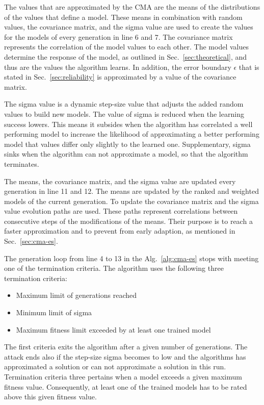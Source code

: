 The values that are approximated by the \ac{CMA} are the means of the distributions of the values that define a model.
These means in combination with random values, the covariance matrix, and the sigma value are used to create the values for the models of every generation in line 6 and 7. %
The covariance matrix represents the correlation of the model values to each other.
The model values determine the response of the \apuf model, as outlined in Sec.\ \ref{sec:theoretical}, and thus are the values the algorithm learns.
In addition, the error boundary $\epsilon$ that is stated in Sec.\ \ref{sec:reliability} is approximated by a value of the covariance matrix.

The sigma value is a dynamic step-size value that adjusts the added random values to build new models.
The value of sigma is reduced when the learning success lowers.
This means it subsides when the algorithm has correlated a well performing model to increase the likelihood of approximating a better performing model that values differ only slightly to the learned one. %
Supplementary, sigma sinks when the algorithm can not approximate a model, so that the algorithm terminates.

The means, the covariance matrix, and the sigma value are updated every generation in line 11 and 12.
The means are updated by the ranked and weighted models of the current generation. %
To update the covariance matrix and the sigma value evolution paths are used.
These paths represent correlations between consecutive steps of the modifications of the means. 
Their purpose is to reach a faster approximation and to prevent from early adaption, as mentioned in Sec.\ \ref{sec:cma-es}.

The generation loop from line 4 to 13 in the Alg.\ \ref{alg:cma-es} stops with meeting one of the termination criteria.
The algorithm uses the following three termination criteria:

\begin{itemize}
\item Maximum limit of generations reached
\item Minimum limit of sigma
\item Maximum fitness limit exceeded by at least one trained model
\end{itemize}

The first criteria exits the algorithm after a given number of generations.
The attack ends also if the step-size sigma becomes to low and the algorithms has approximated a solution or can not approximate a solution in this run. %
Termination criteria three pertains when a model exceeds a given maximum fitness value.
Consequently, at least one of the trained models has to be rated above this given fitness value.

